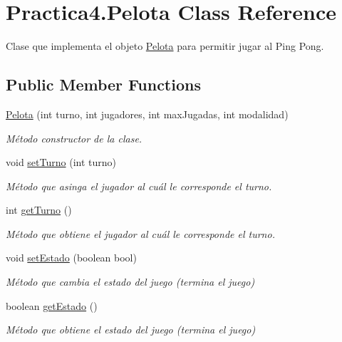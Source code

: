 \hypertarget{class_practica4_1_1_pelota}{}\section{Practica4.\+Pelota Class Reference}
\label{class_practica4_1_1_pelota}


Clase que implementa el objeto \hyperlink{class_practica4_1_1_pelota}{Pelota} para permitir jugar al Ping Pong.  


\subsection*{Public Member Functions}
\begin{DoxyCompactItemize}
\item 
\hyperlink{class_practica4_1_1_pelota_a9bba2cb1e5adaf75e6f994d1e888c510}{Pelota} (int turno, int jugadores, int max\+Jugadas, int modalidad)
\begin{DoxyCompactList}\small\item\em Método constructor de la clase. \end{DoxyCompactList}\item 
void \hyperlink{class_practica4_1_1_pelota_ab11c5110d330f07f4ae8c6db9a4ffc10}{set\+Turno} (int turno)
\begin{DoxyCompactList}\small\item\em Método que asinga el jugador al cuál le corresponde el turno. \end{DoxyCompactList}\item 
int \hyperlink{class_practica4_1_1_pelota_a188f4792d7cba45b3ccd838712f2da45}{get\+Turno} ()
\begin{DoxyCompactList}\small\item\em Método que obtiene el jugador al cuál le corresponde el turno. \end{DoxyCompactList}\item 
void \hyperlink{class_practica4_1_1_pelota_a7a63bb6a91aa761d199bf4f52121929c}{set\+Estado} (boolean bool)
\begin{DoxyCompactList}\small\item\em Método que cambia el estado del juego (termina el juego) \end{DoxyCompactList}\item 
boolean \hyperlink{class_practica4_1_1_pelota_ac35ca764f2c6e26db922a6f5c726fc18}{get\+Estado} ()
\begin{DoxyCompactList}\small\item\em Método que obtiene el estado del juego (termina el juego) \end{DoxyCompactList}\item 

\end{DoxyCompactItemize}
